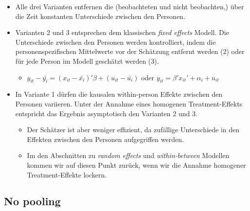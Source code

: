 \documentclass[
]{book}
\providecommand{\tightlist}{%
  \setlength{\itemsep}{0pt}\setlength{\parskip}{0pt}}
\begin{document}
\begin{itemize}
\tightlist
\item
  Alle drei Varianten entfernen die (beobachteten und nicht beobachten,) über die Zeit konstanten Unterschiede zwischen den Personen.
\item
  Varianten 2 und 3 entsprechen dem klassischen \emph{fixed effects} Modell. Die Unterschiede zwischen den Personen werden kontrolliert, indem die personenspezifischen Mittelwerte vor der Schätzung entfernt werden (2) oder für jede Person im Modell geschätzt werden (3).

  \begin{itemize}
  \tightlist
  \item
    \(y_{it}-\bar{y_{i}} = (x_{it} - \bar{x_{i}})'\beta + (u_{it} - \bar{u_{i}})\) oder \(y_{it} = \beta' x_{it}' + \alpha_i + u_{it}\)
  \end{itemize}
\item
  In Variante 1 dürfen die kausalen within-person Effekte zwischen den Personen variieren. Unter der Annahme eines homogenen Treatment-Effekts entspricht das Ergebnis asymptotisch den Varianten 2 und 3.

  \begin{itemize}
  \tightlist
  \item
    Der Schätzer ist aber weniger effizient, da zufällige Unterschiede in den Effekten zwischen den Personen aufgegriffen werden.
  \item
    Im den Abschnitten zu \emph{random effects} und \emph{within-between} Modellen kommen wir auf diesen Punkt zurück, wenn wir die Annahme homogener Treatment-Effekte lockern.
  \end{itemize}
\end{itemize}

\hypertarget{no-pooling}{%
\subsection*{No pooling}\label{no-pooling}}
\end{document}
